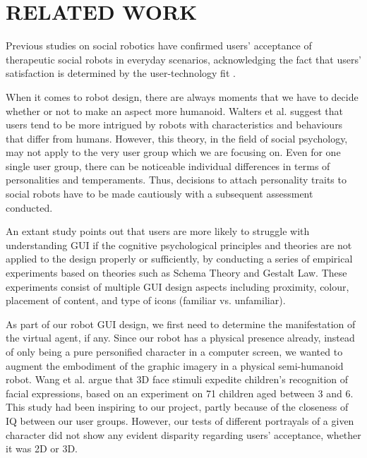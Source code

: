 \documentclass[letterpaper, 10 pt, conference]{ieeeconf}  %
\begin{document}
\section{RELATED WORK}

Previous studies on social robotics have confirmed users' acceptance of therapeutic social robots in everyday scenarios, acknowledging the fact that users' satisfaction is determined by the user-technology fit \cite{Baisch2017}.

When it comes to robot design, there are always moments that we have to decide whether or not to make an aspect more humanoid. Walters et al. \cite{Walters2008} suggest that users tend to be more intrigued by robots with characteristics and behaviours that differ from humans. However, this theory, in the field of social psychology, may not apply to the very user group which we are focusing on. Even for one single user group, there can be noticeable individual differences in terms of personalities and temperaments. Thus, decisions to attach personality traits to social robots have to be made cautiously with a subsequent assessment conducted. 

An extant study \cite{Mohd2012} points out that users are more likely to struggle with understanding GUI if the cognitive psychological principles and theories are not applied to the design properly or sufficiently, by conducting a series of empirical experiments based on theories such as Schema Theory and Gestalt Law. These experiments consist of multiple GUI design aspects including proximity, colour, placement of content, and type of icons (familiar vs. unfamiliar).

As part of our robot GUI design, we first need to determine the manifestation of the virtual agent, if any. Since our robot has a physical presence already, instead of only being a pure personified character in a computer screen, we wanted to augment the embodiment of the graphic imagery in a physical semi-humanoid robot. Wang et al. \cite{Wang2017} argue that 3D face stimuli expedite children's recognition of facial expressions, based on an experiment on 71 children aged between 3 and 6. This study had been inspiring to our project, partly because of the closeness of IQ between our user groups. However, our tests of different portrayals of a given character did not show any evident disparity regarding users' acceptance, whether it was 2D or 3D.
\end{document}
